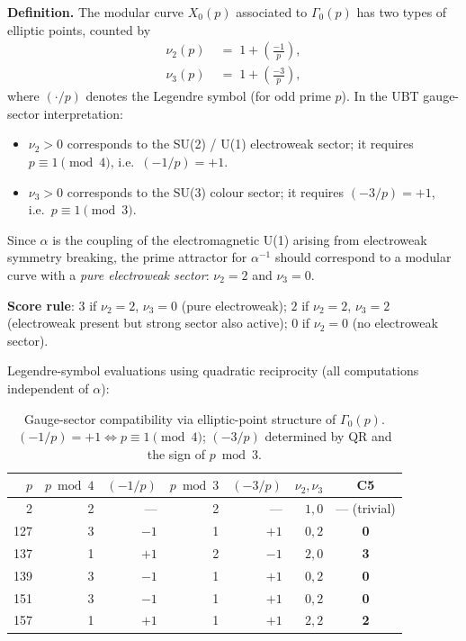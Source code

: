 \documentclass[12pt,a4paper]{article}
\theoremstyle{definition}
\theoremstyle{remark}
\begin{document}
\textbf{Definition.}
The modular curve $X_0(p)$ associated to $\Gamma_0(p)$ has two types of
elliptic points, counted by
\begin{align}
  \nu_2(p) &\;=\; 1 + \left(\frac{-1}{p}\right),
  \label{eq:spr:nu2}\\
  \nu_3(p) &\;=\; 1 + \left(\frac{-3}{p}\right),
  \label{eq:spr:nu3}
\end{align}
where $(\cdot/p)$ denotes the Legendre symbol (for odd prime $p$).
In the UBT gauge-sector interpretation:
\begin{itemize}
  \item $\nu_2 > 0$ corresponds to the SU(2) / U(1) electroweak sector;
        it requires $p \equiv 1 \pmod{4}$, i.e.\ $(-1/p) = +1$.
  \item $\nu_3 > 0$ corresponds to the SU(3) colour sector;
        it requires $(-3/p) = +1$, i.e.\ $p \equiv 1 \pmod{3}$.
\end{itemize}
Since $\alpha$ is the coupling of the electromagnetic U(1) arising from
electroweak symmetry breaking, the prime attractor for $\alpha^{-1}$ should
correspond to a modular curve with a \emph{pure electroweak sector}:
$\nu_2 = 2$ and $\nu_3 = 0$.

\textbf{Score rule}:
$3$ if $\nu_2 = 2$, $\nu_3 = 0$ (pure electroweak);
$2$ if $\nu_2 = 2$, $\nu_3 = 2$ (electroweak present but strong sector also active);
$0$ if $\nu_2 = 0$ (no electroweak sector).

Legendre-symbol evaluations using quadratic reciprocity
(all computations independent of $\alpha$):

\begin{table}[h]
\centering
\caption{Gauge-sector compatibility via elliptic-point structure of
  $\Gamma_0(p)$.  $(-1/p) = +1 \Leftrightarrow p\equiv 1\pmod{4}$;\;
  $(-3/p)$ determined by QR and the sign of $p \bmod 3$.}
\label{tab:spr:c5}
\begin{tabular}{rrrrrrc}
\toprule
$p$ & $p\bmod 4$ & $(-1/p)$ & $p\bmod 3$ & $(-3/p)$ & $\nu_2,\nu_3$ & \textbf{C5} \\
\midrule
  2 & 2 & — & 2 & — & $1,0$ & — (trivial) \\
127 & 3 & $-1$ & 1 & $+1$ & $0,2$ & \textbf{0} \\
137 & 1 & $+1$ & 2 & $-1$ & $2,0$ & \textbf{3} \\
139 & 3 & $-1$ & 1 & $+1$ & $0,2$ & \textbf{0} \\
151 & 3 & $-1$ & 1 & $+1$ & $0,2$ & \textbf{0} \\
157 & 1 & $+1$ & 1 & $+1$ & $2,2$ & \textbf{2} \\
\bottomrule
\end{tabular}
\end{table}
\end{document}
